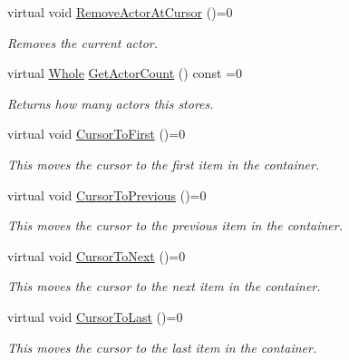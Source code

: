 \begin{DoxyCompactItemize}
virtual void \hyperlink{classphys_1_1ActorContainerBase_a60f37a056e8750f3b389c5ceed14520c}{RemoveActorAtCursor} ()=0
\begin{DoxyCompactList}\small\item\em Removes the current actor. \item\end{DoxyCompactList}\item 
virtual \hyperlink{namespacephys_a460f6bc24c8dd347b05e0366ae34f34a}{Whole} \hyperlink{classphys_1_1ActorContainerBase_aa5ec651d4634b2d90efe2a76f9d2fbdd}{GetActorCount} () const =0
\begin{DoxyCompactList}\small\item\em Returns how many actors this stores. \item\end{DoxyCompactList}\item 
virtual void \hyperlink{classphys_1_1ActorContainerBase_ab1a44758d7c17e70ff2e0f8de47424c3}{CursorToFirst} ()=0
\begin{DoxyCompactList}\small\item\em This moves the cursor to the first item in the container. \item\end{DoxyCompactList}\item 
virtual void \hyperlink{classphys_1_1ActorContainerBase_a7c424168c0bbd973b283a083714123b3}{CursorToPrevious} ()=0
\begin{DoxyCompactList}\small\item\em This moves the cursor to the previous item in the container. \item\end{DoxyCompactList}\item 
virtual void \hyperlink{classphys_1_1ActorContainerBase_a1aa337456a4e74cb5740dbae08778072}{CursorToNext} ()=0
\begin{DoxyCompactList}\small\item\em This moves the cursor to the next item in the container. \item\end{DoxyCompactList}\item 
virtual void \hyperlink{classphys_1_1ActorContainerBase_afad072e018a04c190e5e5fb93b82b354}{CursorToLast} ()=0
\begin{DoxyCompactList}\small\item\em This moves the cursor to the last item in the container. \item\end{DoxyCompactList}\item 

\end{DoxyCompactItemize}
